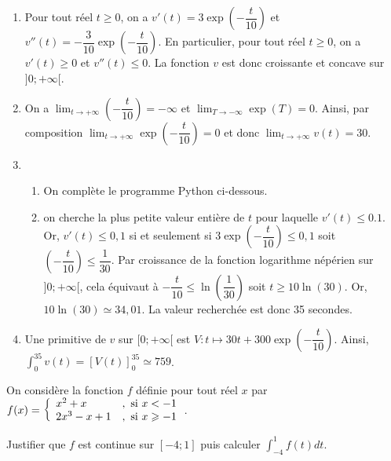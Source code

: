 \documentclass[11pt,fleqn, openany]{book} %
\begin{document}
\begin{solution}
\begin{enumerate}
\item Pour tout réel $t\geqslant 0$, on a $v'(t)=3\exp\left(-\dfrac{t}{10}\right)$ et $v''(t)=-\dfrac{3}{10}\exp\left(-\dfrac{t}{10}\right)$. En particulier, pour tout réel $t\geqslant 0$, on a $v'(t)\geqslant 0$ et $v''(t)\leqslant 0$. La fonction $v$ est donc croissante et concave sur $]0;+\infty[$.
\item On a $\displaystyle\lim_{t \to +\infty}\left(-\dfrac{t}{10}\right)=-\infty$ et $\displaystyle\lim_{T \to -\infty}\exp(T)=0$. Ainsi, par composition $\displaystyle\lim_{t\to +\infty}\exp\left(-\dfrac{t}{10}\right)=0$ et donc $\displaystyle\lim_{t\to +\infty}v(t)=30$.
\item 
\begin{enumerate}
\item On complète le programme Python ci-dessous.

\item on cherche la plus petite valeur entière de $t$ pour laquelle  $v'(t) \leqslant 0.1$. Or, $v'(t)\leqslant 0,1$ si et seulement si $3\exp\left(-\dfrac{t}{10}\right) \leqslant 0,1$ soit $\left(-\dfrac{t}{10}\right) \leqslant \dfrac{1}{30}$. Par croissance de la fonction logarithme népérien sur $]0;+\infty[$, cela équivaut à $-\dfrac{t}{10}\leqslant \ln\left(\dfrac{1}{30}\right)$ soit $t \geqslant 10\ln(30)$. Or, $10\ln(30) \simeq 34,01$. La valeur recherchée est donc 35 secondes.

\end{enumerate}
\item Une primitive de $v$ sur $[0;+\infty[$ est $V:t\mapsto 30t+300\exp\left(-\dfrac{t}{10}\right)$. Ainsi, $\displaystyle\int_0^{35}v(t)=[V(t)]_0^{35}\simeq 759$.
\end{enumerate}

\end{solution}

 
\begin{exercise}On considère la fonction $f$ définie pour tout réel $x$ par $f(x)=\left\{\renewcommand{\arraystretch}{1}\begin{array}{ll} x^2+x&,\text{ si }x<-1\\ 2x^3-x+1&,\text{ si }x\geqslant -1\end{array}\right.$.

 Justifier que $f$ est continue sur $[-4;1]$ puis calculer $\displaystyle\int_{-4}^1 f(t)dt$.\end{exercise}
\end{document}
